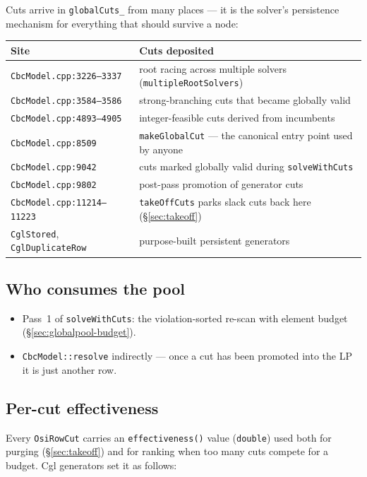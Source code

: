 \documentclass[11pt,a4paper]{article}
\begin{document}
Cuts arrive in \texttt{globalCuts\_} from many places --- it is the
solver's persistence mechanism for everything that should survive a
node:

\begin{tabular}{ll}
\toprule
Site                                & Cuts deposited\\
\midrule
\texttt{CbcModel.cpp:3226--3337}    & root racing across multiple solvers (\texttt{multipleRootSolvers})\\
\texttt{CbcModel.cpp:3584--3586}    & strong-branching cuts that became globally valid\\
\texttt{CbcModel.cpp:4893--4905}    & integer-feasible cuts derived from incumbents\\
\texttt{CbcModel.cpp:8509}          & \texttt{makeGlobalCut} --- the canonical entry point used by anyone\\
\texttt{CbcModel.cpp:9042}          & cuts marked globally valid during \texttt{solveWithCuts}\\
\texttt{CbcModel.cpp:9802}          & post-pass promotion of generator cuts\\
\texttt{CbcModel.cpp:11214--11223}  & \texttt{takeOffCuts} parks slack cuts back here (\S\ref{sec:takeoff})\\
\texttt{CglStored}, \texttt{CglDuplicateRow} & purpose-built persistent generators\\
\bottomrule
\end{tabular}

\subsection*{Who consumes the pool}

\begin{itemize}[leftmargin=*]
  \item Pass~1 of \texttt{solveWithCuts}: the violation-sorted
        re-scan with element budget
        (\S\ref{sec:globalpool-budget}).
  \item \texttt{CbcModel::resolve} indirectly --- once a cut has
        been promoted into the LP it is just another row.
\end{itemize}

\subsection*{Per-cut effectiveness}

Every \texttt{OsiRowCut} carries an \texttt{effectiveness()} value
(\texttt{double}) used both for purging (\S\ref{sec:takeoff}) and
for ranking when too many cuts compete for a budget.  Cgl
generators set it as follows:
\end{document}
